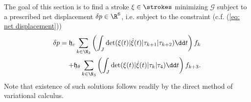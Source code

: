 The goal of this section is to find a stroke $\xi \in \strokes$ minimizing $\mathcal{G}$ subject to a prescribed net displacement $\delta p \in \R^6$, i.e. subject to the constraint (c.f. (\ref{eq: net displacement}))
\begin{equation}
\label{eq: constraint}
\begin{aligned}
	 \delta p = \mathfrak{h}_{c} \sum_{k \in \N_3}\left ( \int_{J} \det( \xi(t) | \dot{\xi}(t) | \tau_{k+1} | \tau_{k+2}) \dd t \right ) f_k\\
	+ \mathfrak{h}_{\theta}  \sum_{k \in \N_3}\left ( \int_{J} \det ( \xi(t) | \dot{\xi}(t) | \tau_{k} | \tau_{4}) \dd t\right ) f_{k + 3}.
\end{aligned}
\end{equation}
Note that existence of such solutions follows readily by the direct method of variational calculus.


